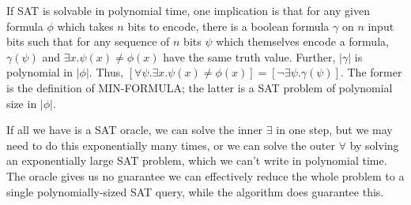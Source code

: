 \documentclass{article}
\begin{document}
If SAT is solvable in polynomial time, one implication is that for any given formula $\phi$ which takes $n$ bits to encode, there is a boolean formula $\gamma$ on $n$ input bits such that for any sequence of $n$ bits $\psi$ which themselves encode a formula, $\gamma(\psi)$ and $\exists x . \psi(x) \neq \phi(x)$ have the same truth value.
Further, $|\gamma|$ is polynomial in $|\phi|$.
Thus, $[\forall \psi . \exists x . \psi(x) \neq \phi(x)] = [\neg \exists \psi . \gamma(\psi)]$.  The former is the definition of MIN-FORMULA; the latter is a SAT problem of polynomial size in $|\phi|$.

If all we have is a SAT oracle, we can solve the inner $\exists$ in one step, but we may need to do this exponentially many times, or we can solve the outer $\forall$ by solving an exponentially large SAT problem, which we can't write in polynomial time.  The oracle gives us no guarantee we can effectively reduce the whole problem to a single polynomially-sized SAT query, while the algorithm does guarantee this.









\end{document}
